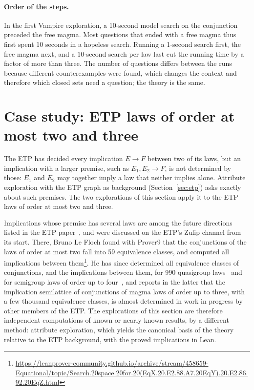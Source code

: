 \documentclass[11pt,a4paper]{article}
\theoremstyle{definition}
\theoremstyle{remark}
\begin{document}
\paragraph{Order of the steps.}
In the first Vampire exploration, a 10-second model search on the conjunction preceded the free magma. Most questions that ended with a free magma thus first spent 10 seconds in a hopeless search. Running a 1-second search first, the free magma next, and a 10-second search per law last cut the running time by a factor of more than three. The number of questions differs between the runs because different counterexamples were found, which changes the context and therefore which closed sets need a question; the theory is the same.

\section{Case study: ETP laws of order at most two and three}\label{sec:case3}

The ETP has decided every implication $E \to F$ between two of its laws, but an implication with a larger premise, such as $E_1, E_2 \to F$, is not determined by those: $E_1$ and $E_2$ may together imply a law that neither implies alone. Attribute exploration with the ETP graph as background (Section~\ref{sec:etp}) asks exactly about such premises. The two explorations of this section apply it to the ETP laws of order at most two and three.

Implications whose premise has several laws are among the future directions listed in the ETP paper~\cite[Section~14, item~(2)]{ETP25}, and were discussed on the ETP's Zulip channel from its start. There, Bruno Le Floch found with Prover9 that the conjunctions of the laws of order at most two fall into 59 equivalence classes, and computed all implications between them\footnote{\url{https://leanprover-community.github.io/archive/stream/458659-Equational/topic/Search.20space.20for.20(EqX.20.E2.88.A7.20EqY).20.E2.86.92.20EqZ.html}}. He has since determined all equivalence classes of conjunctions, and the implications between them, for 990 quasigroup laws~\cite{LF26a} and for semigroup laws of order up to four~\cite{LF26b}, and reports in the latter that the implication semilattice of conjunctions of magma laws of order up to three, with a few thousand equivalence classes, is almost determined in work in progress by other members of the ETP. The explorations of this section are therefore independent computations of known or nearly known results, by a different method: attribute exploration, which yields the canonical basis of the theory relative to the ETP background, with the proved implications in Lean.
\end{document}
